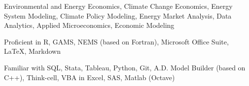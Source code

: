


\begin{pubitems} %
    \item {Environmental and Energy Economics, Climate Change Economics, Energy System Modeling, Climate Policy Modeling, Energy Market Analysis, Data Analytics, Applied Microeconomics, Economic Modeling}
\end{pubitems}




\begin{pubitems} %
    \item {Proficient in R, GAMS, NEMS (based on Fortran), Microsoft Office Suite, \LaTeX, Markdown}
    \item {Familiar with SQL, Stata, Tableau, Python, Git, A.D. Model Builder (based on C++), Think-cell, VBA in Excel, SAS, Matlab (Octave)}
\end{pubitems}







